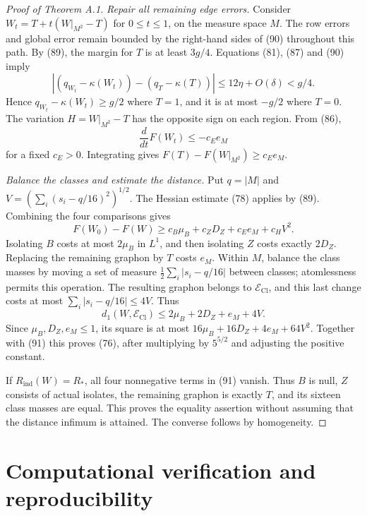 \documentclass[11pt]{amsart}
\theoremstyle{definition}
\theoremstyle{remark}
\begin{document}
\begin{proof}[Proof of Theorem A.1]
\emph{Repair all remaining edge errors.} Consider
$W_t=T+t(W|_{M^2}-T)$ for $0\leq t\leq1$, on the measure space $M$.
The row errors and global error remain bounded by the right-hand
sides of (90) throughout this path. By (89), the margin for $T$ is at
least $3g/4$. Equations (81), (87) and (90) imply
\[
 |(q_{W_t}-\kappa(W_t))-(q_T-\kappa(T))|
 \leq12\eta+O(\delta)<g/4.
\]
Hence $q_{W_t}-\kappa(W_t)\geq g/2$ where $T=1$, and it is at most
$-g/2$ where $T=0$. The variation $H=W|_{M^2}-T$ has the opposite
sign on each region. From (86),
\[
 \frac{d}{dt}F(W_t)\leq-c_Ee_M
\]
for a fixed $c_E>0$. Integrating gives
$F(T)-F(W|_{M^2})\geq c_Ee_M$.

\emph{Balance the classes and estimate the distance.} Put $q=|M|$
and $V=(\sum_i(s_i-q/16)^2)^{1/2}$. The Hessian estimate (78) applies
by (89). Combining the four comparisons gives
\begin{equation}\tag{91}\label{eq:four-defects}
 F(W_0)-F(W)\geq c_B\mu_B+c_ZD_Z+c_Ee_M+c_HV^2.
\end{equation}
Isolating $B$ costs at most $2\mu_B$ in $L^1$, and then isolating $Z$
costs exactly $2D_Z$. Replacing the remaining graphon by $T$ costs
$e_M$. Within $M$, balance the class masses by moving a set of measure
$\tfrac12\sum_i|s_i-q/16|$ between classes; atomlessness permits this
operation. The resulting graphon belongs to $\mathcal E_{\mathrm{Cl}}$,
and this last change costs at most $\sum_i|s_i-q/16|\leq4V$. Thus
\[
 d_1(W,\mathcal E_{\mathrm{Cl}})\leq2\mu_B+2D_Z+e_M+4V.
\]
Since $\mu_B,D_Z,e_M\leq1$, its square is at most
$16\mu_B+16D_Z+4e_M+64V^2$. Together with (91) this proves (76),
after multiplying by $5^{5/2}$ and adjusting the positive constant.

If $R_{\mathrm{ind}}(W)=R_\ast$, all four nonnegative terms in (91)
vanish. Thus $B$ is null, $Z$ consists of actual isolates, the
remaining graphon is exactly $T$, and its sixteen class masses are
equal. This proves the equality assertion without assuming that the
distance infimum is attained. The converse follows by homogeneity.
\end{proof}



\section*{Computational verification and reproducibility}
\end{document}
